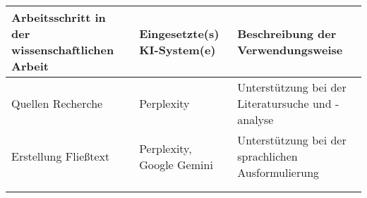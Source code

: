 {\begin{tabular}{|p{4cm}|p{3cm}|p{7cm}|}
    \hline
    \textbf{Arbeitsschritt in der wissenschaftlichen Arbeit} &
%
%
%
    \textbf{Eingesetzte(s) KI-System(e)} & \textbf{Beschreibung der Verwendungsweise} \\
    \hline
    Quellen Recherche & Perplexity & Unterstützung bei der Literatursuche und -analyse \\ %
    \hline
    Erstellung Fließtext & Perplexity, Google Gemini & Unterstützung bei der sprachlichen Ausformulierung \\ %
    \hline
    & & \\
    \hline
    & & \\
    \hline
  \end{tabular}
} %
